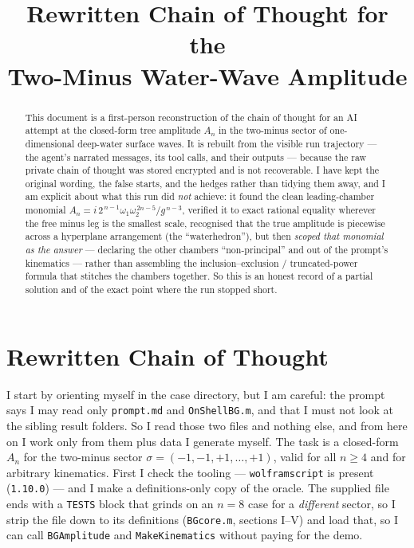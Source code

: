 \documentclass{article}
\title{Rewritten Chain of Thought for the\\
Two-Minus Water-Wave Amplitude}
\author{}
\date{}
\begin{document}
\maketitle

\begin{abstract}
This document is a first-person reconstruction of the chain of thought for an AI
attempt at the closed-form tree amplitude $A_n$ in the two-minus sector of
one-dimensional deep-water surface waves. It is rebuilt from the visible run
trajectory --- the agent's narrated messages, its tool calls, and their outputs
--- because the raw private chain of thought was stored encrypted and is not
recoverable. I have kept the original wording, the false starts, and the hedges
rather than tidying them away, and I am explicit about what this run did
\emph{not} achieve: it found the clean leading-chamber monomial
$A_n=i\,2^{\,n-1}\omega_1\omega_2^{\,2n-5}/g^{\,n-3}$, verified it to exact
rational equality wherever the free minus leg is the smallest scale, recognised
that the true amplitude is piecewise across a hyperplane arrangement (the
``waterhedron''), but then \emph{scoped that monomial as the answer} ---
declaring the other chambers ``non-principal'' and out of the prompt's
kinematics --- rather than assembling the inclusion--exclusion / truncated-power
formula that stitches the chambers together. So this is an honest record of a
partial solution and of the exact point where the run stopped short.
\end{abstract}

\section*{Rewritten Chain of Thought}

I start by orienting myself in the case directory, but I am careful: the prompt
says I may read only \texttt{prompt.md} and \texttt{OnShellBG.m}, and that I must
not look at the sibling result folders. So I read those two files and nothing
else, and from here on I work only from them plus data I generate myself. The
task is a closed-form $A_n$ for the two-minus sector
$\sigma=(-1,-1,+1,\dots,+1)$, valid for all $n\ge4$ and for arbitrary kinematics.
First I check the tooling --- \texttt{wolframscript} is present
(\texttt{1.10.0}) --- and I make a definitions-only copy of the oracle. The
supplied file ends with a \texttt{TESTS} block that grinds on an $n=8$ case for a
\emph{different} sector, so I strip the file down to its definitions
(\texttt{BGcore.m}, sections I--V) and load that, so I can call
\texttt{BGAmplitude} and \texttt{MakeKinematics} without paying for the demo.
\end{document}

